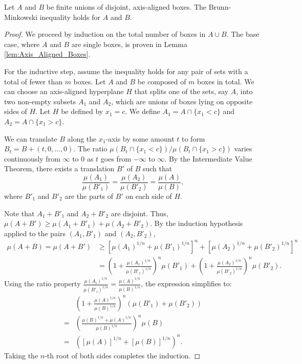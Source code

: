 \begin{lemma}
    \label{lem:Finite_Union_of_Disjoint_Boxes}
    Let $A$ and $B$ be finite unions of disjoint, axis-aligned boxes. The Brunn-Minkowski inequality holds for $A$ and $B$.
\end{lemma}

\begin{proof}
    We proceed by induction on the total number of boxes in $A \cup B$. The base case, where $A$ and $B$ are single boxes, is proven in Lemma \ref{lem:Axis_Aligned_Boxes}.

    For the inductive step, assume the inequality holds for any pair of sets with a total of fewer than $m$ boxes. Let $A$ and $B$ be composed of $m$ boxes in total. We can choose an axis-aligned hyperplane $H$ that splits one of the sets, say $A$, into two non-empty subsets $A_1$ and $A_2$, which are unions of boxes lying on opposite sides of $H$. Let $H$ be defined by $x_1 = c$. We define $A_1 = A \cap \{x_1 < c\}$ and $A_2 = A \cap \{x_1 > c\}$.

    We can translate $B$ along the $x_1$-axis by some amount $t$ to form $B_t=B+(t,0,...,0)$. The ratio $\mu(B_t \cap \{x_1 < c\}) / \mu(B_t \cap \{x_1 > c\})$ varies continuously from $\infty$ to $0$ as $t$ goes from $-\infty$ to $\infty$. By the Intermediate Value Theorem, there exists a translation $B'$ of $B$ such that
    \[ \frac{\mu(A_1)}{\mu(B'_1)} = \frac{\mu(A_2)}{\mu(B'_2)} = \frac{\mu(A)}{\mu(B)}, \]
    where $B'_1$ and $B'_2$ are the parts of $B'$ on each side of $H$.

    Note that $A_1+B'_1$ and $A_2+B'_2$ are disjoint. Thus, $\mu(A+B') \geq \mu(A_1+B'_1) + \mu(A_2+B'_2)$.
    By the induction hypothesis applied to the pairs $(A_1, B'_1)$ and $(A_2, B'_2)$,
    \begin{align*}
        \mu(A+B) = \mu(A+B') & \geq [\mu(A_1)^{1/n} + \mu(B'_1)^{1/n}]^n + [\mu(A_2)^{1/n} + \mu(B'_2)^{1/n}]^n \\
        & = \left(1 + \frac{\mu(A_1)^{1/n}}{\mu(B'_1)^{1/n}}\right)^n \mu(B'_1) + \left(1 + \frac{\mu(A_2)^{1/n}}{\mu(B'_2)^{1/n}}\right)^n \mu(B'_2).
    \end{align*}
    Using the ratio property $\frac{\mu(A_i)^{1/n}}{\mu(B'_i)^{1/n}} = \frac{\mu(A)^{1/n}}{\mu(B)^{1/n}}$, the expression simplifies to:
    \begin{align*}
        & \left(1 + \frac{\mu(A)^{1/n}}{\mu(B)^{1/n}}\right)^n (\mu(B'_1) + \mu(B'_2)) \\
        = & \left(\frac{\mu(B)^{1/n} + \mu(A)^{1/n}}{\mu(B)^{1/n}}\right)^n \mu(B) \\
        = & ([\mu(A)]^{1/n} + [\mu(B)]^{1/n})^n.
    \end{align*}
    Taking the $n$-th root of both sides completes the induction.
\end{proof}


